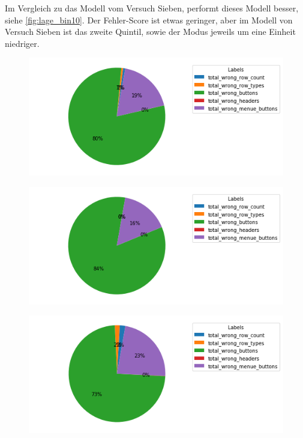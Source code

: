 \documentclass[pdftex,a4paper,halfparskip, article]{scrartcl}
\begin{document}
Im Vergleich zu das Modell vom Versuch Sieben, performt dieses Modell besser, siehe \ref{fig:lage_bin10}. Der Fehler-Score ist etwas geringer, aber im Modell von Versuch Sieben ist das zweite Quintil, sowie der Modus jeweils um eine Einheit niedriger. 

\begin{figure}
\centering
\begin{minipage}{.5\textwidth}
  \centering
  \includegraphics[width=1\linewidth]{predictions_bin15_total_error_types_pie_chart}
  \label{fig:fehler_gesamt_bin15}
\end{minipage}%
\begin{minipage}{.5\textwidth}
  \centering
  \includegraphics[width=1\linewidth]{predictions_bin15_excluded_p80_error_types_pie_chart}
  \label{fig:fehler_beste80_bin15}
\end{minipage}
\begin{minipage}{.5\textwidth}
  \centering
   \includegraphics[width=1\linewidth]{predictions_bin15_p80_error_types_pie_chart}
  \label{fig:fehler_schlechteste20_bin15}
\end{minipage}
\end{figure}
\end{document}
